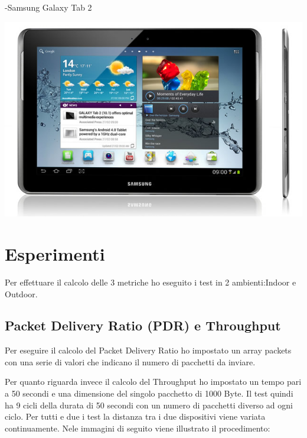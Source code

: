-Samsung Galaxy Tab 2

\begin{center}
\includegraphics[width=1\textwidth]{imgs/galaxy_tab_2.jpg}
\label{galaxy_tab_2_img}%
\end{center}

\section{Esperimenti}
Per effettuare il calcolo delle 3 metriche ho eseguito i test in 2 ambienti:Indoor e Outdoor.

\subsection{Packet Delivery Ratio (PDR) e Throughput}

Per eseguire il calcolo del Packet Delivery Ratio ho impostato un array packets con una serie di valori che indicano il numero di pacchetti da inviare.

Per quanto riguarda invece il calcolo del Throughput ho impostato un tempo pari a 50 secondi e una dimensione del singolo pacchetto di 1000 Byte.
Il test quindi ha 9 cicli della durata di 50 secondi con un numero di pacchetti diverso ad ogni ciclo.
Per tutti e due i test la distanza tra i due dispositivi viene variata continuamente.
Nele immagini di seguito viene illustrato il procedimento:

